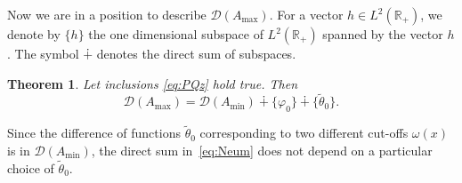 \documentclass[10pt,a4paper]{amsart}
\numberwithin{equation}{section}
\newtheorem{Theorem}{Theorem}[section]
\begin{document}
Now we are in a position to describe ${\mathcal D}(A_{\max})$.
 For a vector $h\in L^2 ({\mathbb R}_{+})$, we denote by $\{h\}$ the one dimensional subspace of $L^2 ({\mathbb R}_{+})$ spanned by the vector $h$. The symbol $\dotplus$ denotes the direct sum of subspaces.

 \begin{Theorem}\label{Neum}
 Let inclusions \eqref{eq:PQz} hold true.
Then
\begin{equation}
{\mathcal D}(A_{\max})= {\mathcal D}(A_{\min}) \dotplus \{\varphi_{0 } \}\dotplus \big\{\tilde{\theta}_{0} \big\}.
 \label{eq:Neum}\end{equation}
 \end{Theorem}

 \begin{Remark}\label{Neur}
 Since the difference of functions $\tilde{\theta}_0 $ corresponding to two different cut-offs $\omega(x)$ is in ${\mathcal D}(A_{\min})$, the direct sum in~\eqref{eq:Neum} does not depend on a particular choice of $\tilde{\theta}_0$.
 \end{Remark}
\end{document}
